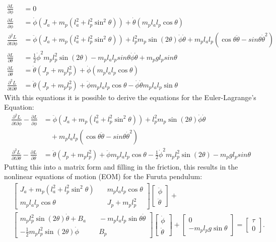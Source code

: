 \begin{align*}
	\frac{\partial L}{\partial \phi}&=0\\
	\frac{\partial L}{\partial 
	\dot{\phi}}&=\dot{\phi}(J_a+m_p(l_a^2+l_p^2\sin^2\theta))+\dot{\theta}(
	m_pl_al_p\cos\theta)\\
	\frac{\partial^2 L}{\partial t \partial \dot{\phi}}&= 
	\ddot{\phi}(J_a+m_p(l_a^2+l_p^2\sin^2 \theta))+l_p^2m_p\sin(2\theta)
	\dot{\phi}\dot{\theta}+m_pl_al_p(\cos 
	\theta\ddot{\theta}-sin\theta \dot{\theta}^2)\\
	\frac{\partial L}{\partial 
	\theta}&=\frac{1}{2}\dot{\phi}^2m_pl_p^2\sin(2\theta)-m_pl_al_psin\theta\dot{\phi}
	\dot{\theta}+m_pgl_psin\theta\\
	\frac{\partial L}{\partial 
		\dot{\theta}}&=\dot{\theta}(J_p+m_pl_p^2)+\dot{\phi}(m_pl_al_p\cos\theta)\\
	\frac{\partial^2 L}{\partial t \partial 
	\dot{\theta}}&=\ddot{\theta}(J_p+m_pl_p^2)+\ddot{\phi}m_pl_al_p\cos\theta-\dot{\phi}
	\dot{\theta}m_pl_al_p\sin\theta
\end{align*}
With this equations it is possible to derive the equations for the 
Euler-Lagrange's Equation:
\begin{align*}
\frac{\partial^2 L}{\partial t\partial\dot{\phi}}-\frac{\partial 
L}{\partial\dot{\phi}}&=\ddot{\phi}(J_a+m_p(l_a^2+l_p^2\sin^2 
\theta))+l_p^2m_p\sin(2\theta)
\dot{\phi}\dot{\theta}\\ &\quad + m_pl_al_p(\cos 
\theta\ddot{\theta}-sin\theta \dot{\theta}^2)\\
\frac{\partial^2 L}{\partial t\partial\dot{\theta}}-\frac{\partial 
L}{\partial\dot{\theta}}&=\ddot{\theta}(J_p+m_pl_p^2)+\ddot{\phi}m_pl_al_p\cos\theta-\frac{1}{2}\dot{\phi}^2m_pl_p^2\sin(2\theta)-m_pgl_psin\theta
\end{align*}
Putting this into a matrix form and filling in the friction, this results in 
the nonlinear equations of motion (EOM) for the Furuta pendulum:
\begin{align*}
&\begin{bmatrix}
J_a+m_p(l_a^2+l_p^2\sin^2\theta)& \quad m_pl_al_p\cos\theta \\ 
m_pl_al_p\cos\theta& \quad J_p+m_pl_p^2 
\end{bmatrix} 
\begin{bmatrix}
\ddot{\phi}\\
\ddot{\theta}
\end{bmatrix} + \\
&\begin{bmatrix}
m_pl_p^2\sin(2\theta)\dot{\theta}+ B_a& \quad -m_pl_al_p\sin \theta 
\dot{\theta}\\
-\frac{1}{2}m_pl_p^2\sin(2\theta)\dot{\phi} &\quad B_p
\end{bmatrix}
\begin{bmatrix}
\dot{\phi}\\
\dot{\theta}
\end{bmatrix} +
\begin{bmatrix}
0\\
-m_pl_pg\sin\theta
\end{bmatrix}=\begin{bmatrix}
\tau \\
0
\end{bmatrix}.
\end{align*}
